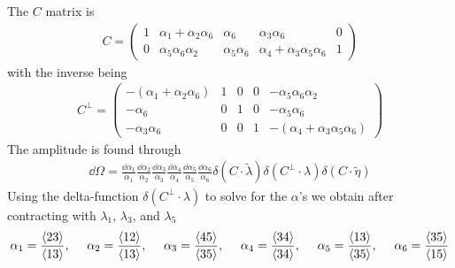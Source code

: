 \documentclass[letter,11pt]{article}
\begin{document}
The $C$ matrix is
\begin{equation}
	\begin{aligned}
		C=\begin{pmatrix}
			1 & \alpha_1+\alpha_2\alpha_6 & \alpha_6 & \alpha_3\alpha_6 & 0\\
			0 & \alpha_5 \alpha_6 \alpha_2 & \alpha_5 \alpha_6 & \alpha_4+\alpha_3\alpha_5\alpha_6 & 1
		\end{pmatrix}
	\end{aligned}
\end{equation}
with the inverse being
\begin{equation}
	\begin{aligned}
		C^\perp =\begin{pmatrix}
			-(\alpha_1+\alpha_2\alpha_6) & 1 & 0 & 0 & -\alpha_5 \alpha_6 \alpha_2\\
			-\alpha_6 & 0 & 1 & 0 & -\alpha_5 \alpha_6 \\
			-\alpha_3 \alpha_6 & 0 & 0 & 1 & -(\alpha_4+\alpha_3\alpha_5\alpha_6)
		\end{pmatrix}
	\end{aligned}
\end{equation}
The amplitude is found through
\begin{equation}
	\begin{aligned}
		\dd \Omega =\frac{\dd \alpha_1}{\alpha_1}\frac{\dd \alpha_2}{\alpha_2}\frac{\dd \alpha_3}{\alpha_3}\frac{\dd \alpha_4}{\alpha_4}\frac{\dd \alpha_5}{\alpha_5}\frac{\dd \alpha_6}{\alpha_6}\delta(C\cdot \tilde \lambda) \delta(C^\perp\cdot \lambda)\delta(C\cdot \tilde \eta)
	\end{aligned}
\end{equation}
Using the delta-function $\delta(C^\perp\cdot \lambda)$ to solve for the $\alpha$'s we obtain after contracting with $\lambda_1$, $\lambda_3$, and $\lambda_5$
\begin{equation}
	\begin{aligned}
		\alpha_1=\frac{\expval{23}}{\expval{13}},~~~~
		\alpha_2=\frac{\expval{12}}{\expval{13}},~~~~
		\alpha_3=\frac{\expval{45}}{\expval{35}},~~~~
		\alpha_4=\frac{\expval{34}}{\expval{34}},~~~~
		\alpha_5=\frac{\expval{13}}{\expval{35}},~~~~
		\alpha_6=\frac{\expval{35}}{\expval{15}}
	\end{aligned}
\end{equation}
\end{document}
